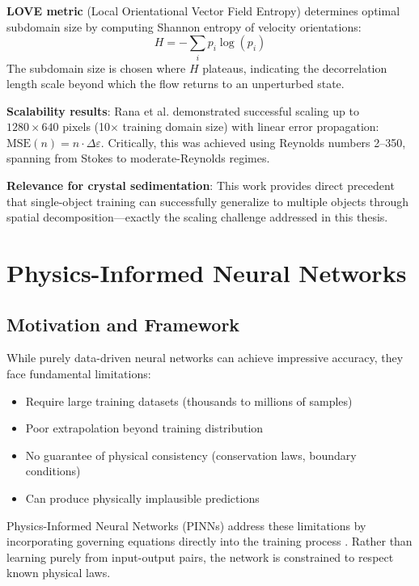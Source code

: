 \textbf{LOVE metric} (Local Orientational Vector Field Entropy) determines optimal subdomain size by computing Shannon entropy of velocity orientations:
\begin{equation}
H = -\sum_i p_i \log(p_i)
\end{equation}
The subdomain size is chosen where $H$ plateaus, indicating the decorrelation length scale beyond which the flow returns to an unperturbed state.

\textbf{Scalability results}: Rana et al. demonstrated successful scaling up to $1280 \times 640$ pixels (10$\times$ training domain size) with linear error propagation: $\text{MSE}(n) = n \cdot \Delta\varepsilon$. Critically, this was achieved using Reynolds numbers 2--350, spanning from Stokes to moderate-Reynolds regimes.

\textbf{Relevance for crystal sedimentation}: This work provides direct precedent that single-object training can successfully generalize to multiple objects through spatial decomposition---exactly the scaling challenge addressed in this thesis.

\section{Physics-Informed Neural Networks}
\label{sec:pinns}

\subsection{Motivation and Framework}

While purely data-driven neural networks can achieve impressive accuracy, they face fundamental limitations:
\begin{itemize}
    \item Require large training datasets (thousands to millions of samples)
    \item Poor extrapolation beyond training distribution
    \item No guarantee of physical consistency (conservation laws, boundary conditions)
    \item Can produce physically implausible predictions
\end{itemize}

Physics-Informed Neural Networks (PINNs) address these limitations by incorporating governing equations directly into the training process \cite{raissi2019physics}. Rather than learning purely from input-output pairs, the network is constrained to respect known physical laws.

